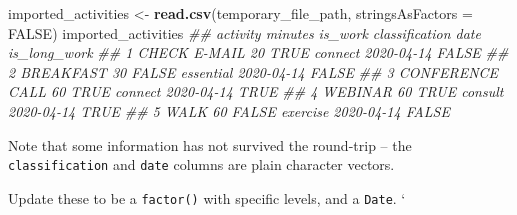 \documentclass[]{book}
\newenvironment{Shaded}{\begin{snugshade}}{\end{snugshade}}
\newcommand{\CommentTok}[1]{\textcolor[rgb]{0.56,0.35,0.01}{\textit{#1}}}
\newcommand{\DataTypeTok}[1]{\textcolor[rgb]{0.13,0.29,0.53}{#1}}
\newcommand{\KeywordTok}[1]{\textcolor[rgb]{0.13,0.29,0.53}{\textbf{#1}}}
\newcommand{\NormalTok}[1]{#1}
\newcommand{\OperatorTok}[1]{\textcolor[rgb]{0.81,0.36,0.00}{\textbf{#1}}}
\newcommand{\OtherTok}[1]{\textcolor[rgb]{0.56,0.35,0.01}{#1}}
\newcommand{\StringTok}[1]{\textcolor[rgb]{0.31,0.60,0.02}{#1}}
\begin{document}
\begin{Shaded}
\begin{Highlighting}[]
\NormalTok{imported_activities <-}\StringTok{ }\KeywordTok{read.csv}\NormalTok{(temporary_file_path, }\DataTypeTok{stringsAsFactors =} \OtherTok{FALSE}\NormalTok{)}
\NormalTok{imported_activities}
\CommentTok{##          activity minutes is_work classification       date is_long_work}
\CommentTok{## 1    CHECK E-MAIL      20    TRUE        connect 2020-04-14        FALSE}
\CommentTok{## 2       BREAKFAST      30   FALSE      essential 2020-04-14        FALSE}
\CommentTok{## 3 CONFERENCE CALL      60    TRUE        connect 2020-04-14         TRUE}
\CommentTok{## 4         WEBINAR      60    TRUE        consult 2020-04-14         TRUE}
\CommentTok{## 5            WALK      60   FALSE       exercise 2020-04-14        FALSE}
\end{Highlighting}
\end{Shaded}

Note that some information has not survived the round-trip -- the \texttt{classification} and \texttt{date} columns are plain character vectors.

\begin{Shaded}
\end{Shaded}

Update these to be a \texttt{factor()} with specific levels, and a \texttt{Date}.
`
\end{document}
